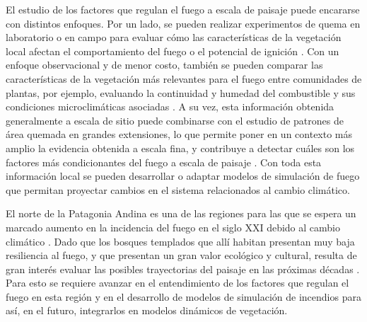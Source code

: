 El estudio de los factores que regulan el fuego a escala de paisaje puede encararse con distintos enfoques. Por un lado, se pueden realizar experimentos de quema en laboratorio o en campo para evaluar cómo las características de la vegetación local afectan el comportamiento del fuego o el potencial de ignición \citep{butler2004radiation,bianchi_ignition_2014,mcallister2016critical}. Con un enfoque observacional y de menor costo, también se pueden comparar las características de la vegetación más relevantes para el fuego entre comunidades de plantas, por ejemplo, evaluando la continuidad y humedad del combustible y sus condiciones microclimáticas asociadas \citep{paritsis_pine_2018, tiribelli_changes_2018, bianchi_comparison_2018}. A su vez, esta información obtenida generalmente a escala de sitio puede combinarse con el estudio de patrones de área quemada en grandes extensiones, lo que permite poner en un contexto más amplio la evidencia obtenida a escala fina, y contribuye a detectar cuáles son los factores más condicionantes del fuego a escala de paisaje \citep{mermoz_deteccion_2002, holz_ecological_2012, paritsis_habitat_2013}. Con toda esta información local se pueden desarrollar o adaptar modelos de simulación de fuego que permitan proyectar cambios en el sistema relacionados al cambio climático. 


El norte de la Patagonia Andina es una de las regiones para las que se espera un marcado aumento en la incidencia del fuego en el siglo XXI debido al cambio climático \citep{kitzberger_projections_2022}. Dado que los bosques templados que allí habitan presentan muy baja resiliencia al fuego, y que presentan un gran valor ecológico y cultural, resulta de gran interés evaluar las posibles trayectorias del paisaje en las próximas décadas \citep{kitzberger_firevegetation_2016}. Para esto se requiere avanzar en el entendimiento de los factores que regulan el fuego en esta región y en el desarrollo de modelos de simulación de incendios para así, en el futuro, integrarlos en modelos dinámicos de vegetación. 


